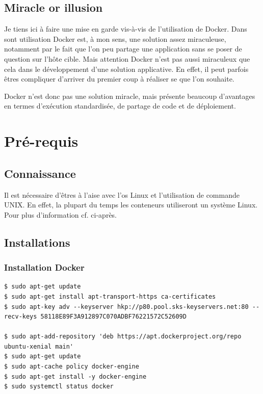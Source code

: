 \subsection{Miracle or illusion}
Je tiens ici à faire une mise en garde vis-à-vis de l'utilisation de Docker. Dans sont utilisation Docker est, à mon sens, une solution assez miraculeuse, notamment par le fait que l'on peu partage une application sans se poser de question sur l'hôte cible. Mais attention Docker n'est pas aussi miraculeux que cela dans le développement d'une solution applicative. En effet, il peut parfois êtres compliquer d'arriver du premier coup à réaliser se que l'on souhaite.

Docker n'est donc pas une solution miracle, mais présente beaucoup d'avantages en termes d'exécution standardisée, de partage de code et de déploiement.

\section{Pré-requis}
\subsection{Connaissance}
Il est nécessaire d'êtres à l’aise avec l'\gls{os} Linux et l'utilisation de commande UNIX. En effet, la plupart du temps les conteneurs utiliseront un système Linux. Pour plus d'information cf. ci-après.


\subsection{Installations}
\lstset{language=bash}

\subsubsection{Installation Docker}
\begin{lstlisting}[frame=single]
$ sudo apt-get update
$ sudo apt-get install apt-transport-https ca-certificates
$ sudo apt-key adv --keyserver hkp://p80.pool.sks-keyservers.net:80 --recv-keys 58118E89F3A912897C070ADBF76221572C52609D

$ sudo apt-add-repository 'deb https://apt.dockerproject.org/repo ubuntu-xenial main'
$ sudo apt-get update
$ sudo apt-cache policy docker-engine
$ sudo apt-get install -y docker-engine
$ sudo systemctl status docker
\end{lstlisting}

